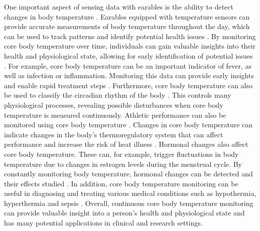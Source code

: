One important aspect of sensing data with earables is the ability to detect changes in body temperature \cite{dolsonWearableSensorTechnology2022, bonziAccuracyPeripheralThermometers2016, NovelWearableDevice2021}. 
Earables equipped with temperature sensors can provide accurate measurements of body temperature throughout the day, which can be used to track patterns and identify potential health issues \cite{rajbhandaryFeasibilityContinuousMonitoring2020a}.
By monitoring core body temperature over time, individuals can gain valuable insights into their health and physiological state, allowing for early identification of potential issues \cite{mrozekBrainTemperaturePhysiology2012}.
For example, core body temperature can be an important indicator of fever, as well as infection or inflammation. 
Monitoring this data can provide early insights and enable rapid treatment steps \cite{NovelWearableDevice2021}.
Furthermore, core body temperature can also be used to classify the circadian rhythm of the body \cite{liCircadianRhythmAnalysis2021, juSleepQualityPreclinical2013}.
This controls many physiological processes, revealing possible disturbances when core body temperature is measured continuously.
Athletic performance can also be monitored using core body temperature \cite{boanoNoninvasiveMeasurementCore2013}.
Changes in core body temperature can indicate changes in the body's thermoregulatory system that can affect performance and increase the risk of heat illness \cite{gabbettAthleteMonitoringCycle2017, silvaSleepQualityTraining2022}.
Hormonal changes also affect core body temperature. 
These can, for example, trigger fluctuations in body temperature due to changes in estrogen levels during the menstrual cycle. 
By constantly monitoring body temperature, hormonal changes can be detected and their effects studied \cite{goeckenjanContinuousBodyTemperature2020, charkoudianAutonomicControlBody2017, hamataniEstimatingCoreBody2015}.
In addition, core body temperature monitoring can be useful in diagnosing and treating various medical conditions such as hypothermia, hyperthermia and sepsis \cite{hardingTemperatureDependenceSleep2019, guilleminaultChronicInsomniaPremenopausal2002, raymannSkinDeepEnhanced2008}.
Overall, continuous core body temperature monitoring can provide valuable insight into a person's health and physiological state and has many potential applications in clinical and research settings.

